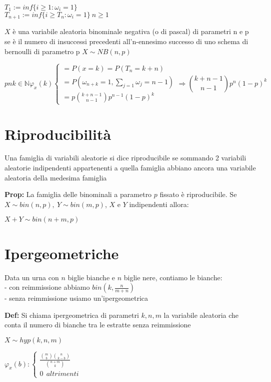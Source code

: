 \documentclass[12pt, a4paper]{article}
\begin{document}
$T_{1}:=inf\{i\geq 1: \omega_{i}=1\}$\\
$T_{n+1}:=inf\{i\geq T_{n}: \omega_{i}=1\}\ n\geq 1$

$X$ è una variabile aleatoria binominale negativa (o di pascal) di parametri n e p se è il numero di insuccessi precedenti
all'n-ennesimo successo di uno schema di bernoulli di parametro p $X\sim NB(n,p)$

\begin{equation}
    pn k\in\mathbb{N} \varphi_{x}(k)
    \begin{cases}
        = P(x=k)=P(T_{n}=k+n)\\
        = P(\omega_{n+k}=1,\sum_{j=1}\omega_{j}=n-1)\\
        = p \binom{k+n-1}{n-1} p^{n-1}(1-p)^{k} 
    \end{cases}    
    \Rightarrow \binom{k+n-1}{n-1} p^{n}(1-p)^{k} 
\end{equation}

\newpage
\section{Riproducibilità}
Una famiglia di variabili aleatorie si dice riproducibile se sommando 2 variabili aleatorie indipendenti appartenenti
a quella famiglia abbiano ancora una variabile aleatoria della medesima famiglia

\textbf{Prop:} La famiglia delle binominali a parametro $p$ fissato è riproducibile. Se $X\sim bin(n,p),\ 
Y\sim bin(m,p)$, $X$ e $Y$ indipendenti allora:
\begin{center}
    $X+Y\sim bin(n+m,p)$
\end{center}

\section{Ipergeometriche}
Data un urna con $n$ biglie bianche e $n$ biglie nere, contiamo le bianche:\\
- con reimmissione abbiamo $bin(k,\frac{n}{m+n})$\\
- senza reimmissione usiamo un'ipergeometrica

\textbf{Def:} Si chiama ipergeometrica di parametri $k,n,m$ la variabile aleatoria che conta il numero di bianche
tra le estratte senza reimmissione
\begin{center}
    $X\sim hyp(k,n,m)$
\end{center}

$\varphi_{x}(b):
\begin{cases}
    \frac{\binom{m}{b}\binom{n}{k-b}}{\binom{n+m}{k}}\\
    0\ \ altrimenti
\end{cases}$
\end{document}
